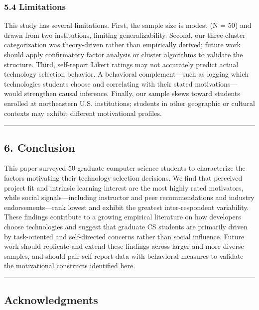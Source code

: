 \documentclass[
]{article}
\begin{document}
\subsubsection{5.4 Limitations}\label{limitations}

This study has several limitations. First, the sample size is modest (N
= 50) and drawn from two institutions, limiting generalizability.
Second, our three-cluster categorization was theory-driven rather than
empirically derived; future work should apply confirmatory factor
analysis or cluster algorithms to validate the structure. Third,
self-report Likert ratings may not accurately predict actual technology
selection behavior. A behavioral complement---such as logging which
technologies students choose and correlating with their stated
motivations---would strengthen causal inference. Finally, our sample
skews toward students enrolled at northeastern U.S. institutions;
students in other geographic or cultural contexts may exhibit different
motivational profiles.

\begin{center}\rule{0.5\linewidth}{0.5pt}\end{center}

\subsection{6. Conclusion}\label{conclusion}

This paper surveyed 50 graduate computer science students to
characterize the factors motivating their technology selection
decisions. We find that perceived project fit and intrinsic learning
interest are the most highly rated motivators, while social
signals---including instructor and peer recommendations and industry
endorsements---rank lowest and exhibit the greatest inter-respondent
variability. These findings contribute to a growing empirical literature
on how developers choose technologies and suggest that graduate CS
students are primarily driven by task-oriented and self-directed
concerns rather than social influence. Future work should replicate and
extend these findings across larger and more diverse samples, and should
pair self-report data with behavioral measures to validate the
motivational constructs identified here.

\begin{center}\rule{0.5\linewidth}{0.5pt}\end{center}

\subsection{Acknowledgments}\label{acknowledgments}
\end{document}
